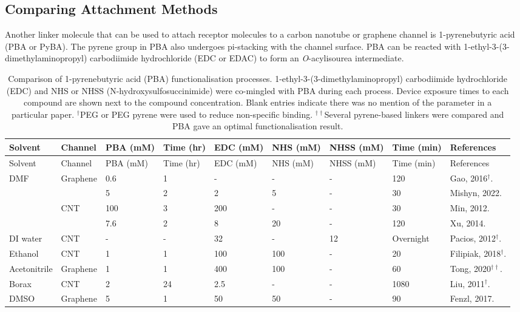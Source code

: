 \documentclass[
  a4paper,
]{scrbook}
\begin{document}
\hypertarget{comparing-attachment-methods}{%
\subsection{Comparing Attachment
Methods}\label{comparing-attachment-methods}}

Another linker molecule that can be used to attach receptor molecules to
a carbon nanotube or graphene channel is 1-pyrenebutyric acid (PBA or
PyBA). The pyrene group in PBA also undergoes pi-stacking with the
channel surface. PBA can be reacted with
1-ethyl-3-(3-dimethylaminopropyl) carbodiimide hydrochloride (EDC or
EDAC) to form an \emph{O}-acylisourea intermediate.

\begin{landscape}
\begin{center}

\hypertarget{tbl-pba-functionalisation}{}
\begin{longtable}[]{@{}lllllllll@{}}
\caption{\label{tbl-pba-functionalisation}Comparison of 1-pyrenebutyric
acid (PBA) functionalisation processes.
1-ethyl-3-(3-dimethylaminopropyl) carbodiimide hydrochloride (EDC) and
NHS or NHSS (N-hydroxysulfosuccinimide) were co-mingled with PBA during
each process. Device exposure times to each compound are shown next to
the compound concentration. Blank entries indicate there was no mention
of the parameter in a particular paper. \(^†\)PEG or PEG pyrene were
used to reduce non-specific binding. \(^{††}\)Several pyrene-based
linkers were compared and PBA gave an optimal functionalisation
result.}\tabularnewline
\toprule\noalign{}
Solvent & Channel & PBA (mM) & Time (hr) & EDC (mM) & NHS (mM) & NHSS
(mM) & Time (min) & References \\
\midrule\noalign{}
\endfirsthead
\toprule\noalign{}
Solvent & Channel & PBA (mM) & Time (hr) & EDC (mM) & NHS (mM) & NHSS
(mM) & Time (min) & References \\
\midrule\noalign{}
\endhead
\bottomrule\noalign{}
\endlastfoot
DMF & Graphene & 0.6 & 1 & - & - & - & 120 & Gao, 2016\(^†\).
\cite{Gao2016} \\
& & 5 & 2 & 2 & 5 & - & 30 & Mishyn, 2022. \cite{Mishyn2022} \\
& CNT & 100 & 3 & 200 & - & - & 30 & Min, 2012. \cite{Min2012} \\
& & 7.6 & 2 & 8 & 20 & - & 120 & Xu, 2014. \cite{Xu2014} \\
DI water & CNT & - & - & 32 & - & 12 & Overnight & Pacios, 2012\(^†\).
\cite{Pacios2012} \\
Ethanol & CNT & 1 & 1 & 100 & 100 & - & 20 & Filipiak, 2018\(^†\).
\cite{Filipiak2018} \\
Acetonitrile & Graphene & 1 & 1 & 400 & 100 & - & 60 & Tong,
2020\(^{††}\). \cite{Tong2020} \\
Borax & CNT & 2 & 24 & 2.5 & - & - & 1080 & Liu, 2011\(^†\).
\cite{Liu2011} \\
DMSO & Graphene & 5 & 1 & 50 & 50 & - & 90 & Fenzl, 2017.
\cite{Fenzl2017} \\
\end{longtable}


\end{center}
\end{landscape}
\end{document}
